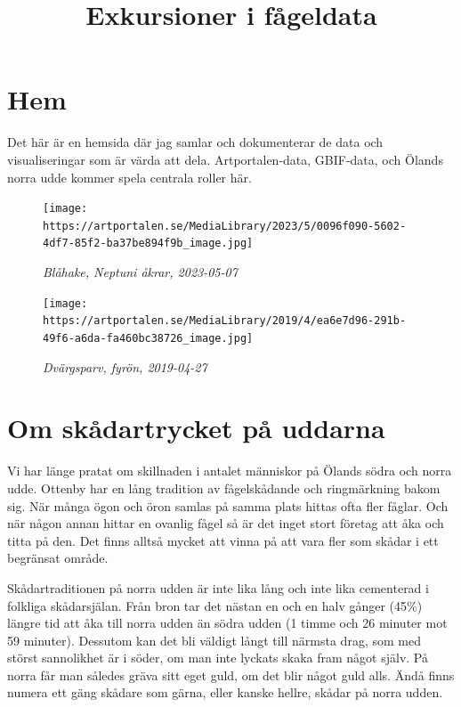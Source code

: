 \documentclass[
]{book}
\title{Exkursioner i fågeldata}
\author{}
\date{\vspace{-2.5em}}
\begin{document}
\maketitle

{
\setcounter{tocdepth}{1}
\tableofcontents
}
\hypertarget{hem}{%
\chapter*{Hem}\label{hem}}

Det här är en hemsida där jag samlar och dokumenterar de data och visualiseringar som är värda att dela. Artportalen-data, GBIF-data, och Ölands norra udde kommer spela centrala roller här.

\begin{figure}
\centering
\texttt{[image: https://artportalen.se/MediaLibrary/2023/5/0096f090-5602-4df7-85f2-ba37be894f9b\_image.jpg]}
\caption{\emph{Blåhake, Neptuni åkrar, 2023-05-07}}
\end{figure}

\begin{figure}
\centering
\texttt{[image: https://artportalen.se/MediaLibrary/2019/4/ea6e7d96-291b-49f6-a6da-fa460bc38726\_image.jpg]}
\caption{\emph{Dvärgsparv, fyrön, 2019-04-27}}
\end{figure}

\hypertarget{om-skuxe5dartrycket-puxe5-uddarna}{%
\chapter{Om skådartrycket på uddarna}\label{om-skuxe5dartrycket-puxe5-uddarna}}

Vi har länge pratat om skillnaden i antalet människor på Ölands södra och norra udde. Ottenby har en lång tradition av fågelskådande och ringmärkning bakom sig. När många ögon och öron samlas på samma plats hittas ofta fler fåglar. Och när någon annan hittar en ovanlig fågel så är det inget stort företag att åka och titta på den. Det finns alltså mycket att vinna på att vara fler som skådar i ett begränsat område.

Skådartraditionen på norra udden är inte lika lång och inte lika cementerad i folkliga skådarsjälan. Från bron tar det nästan en och en halv gånger (45\%) längre tid att åka till norra udden än södra udden (1 timme och 26 minuter mot 59 minuter). Dessutom kan det bli väldigt långt till närmsta drag, som med störst sannolikhet är i söder, om man inte lyckats skaka fram något själv. På norra får man således gräva sitt eget guld, om det blir något guld alls. Ändå finns numera ett gäng skådare som gärna, eller kanske hellre, skådar på norra udden.
\end{document}
